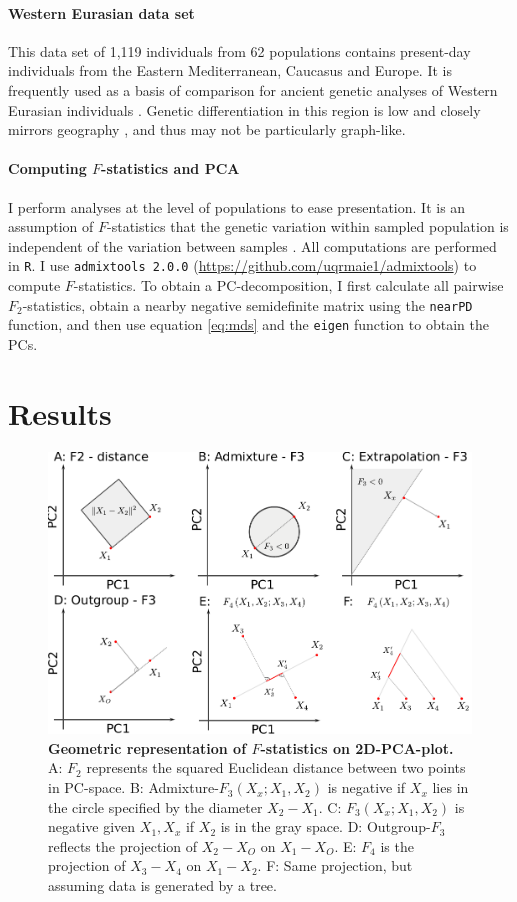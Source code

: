 \documentclass[12pt,fullpage, a4paper]{article}
\begin{document}
\paragraph{Western Eurasian data set}
This data set of 1,119 individuals from 62 populations contains  present-day individuals from the Eastern Mediterranean, Caucasus and Europe. It is frequently used as a basis of comparison for ancient genetic analyses of Western Eurasian individuals \citep{patterson2012, lazaridis2014}. Genetic differentiation in this region is low and closely mirrors geography \citep{novembre2008}, and thus may not be particularly graph-like.


\paragraph{Computing $F$-statistics and PCA}
I perform analyses at the level of populations to ease presentation.  It is an assumption of $F$-statistics that the genetic variation within sampled population is independent of the variation between samples \citep{patterson2012}. All computations are performed in \texttt{R}. I use \texttt{admixtools 2.0.0} (\url{https://github.com/uqrmaie1/admixtools}) to compute $F$-statistics. To obtain a PC-decomposition, I first calculate all pairwise $F_2$-statistics, obtain a nearby negative semidefinite matrix using the \texttt{nearPD} function, and then use equation \ref{eq:mds} and the \texttt{eigen} function to obtain the PCs. 

\section{Results}

\begin{figure}[!ht]
	\includegraphics[width=\textwidth]{figures/fstats_on_pca.pdf}
	\caption{\textbf{Geometric representation of $F$-statistics on 2D-PCA-plot.} A: $F_2$ represents the squared Euclidean distance between two points in PC-space. B: Admixture-$F_3(X_x; X_1, X_2)$ is negative if $X_x$ lies in the circle specified by the diameter $X_2-X_1$. C: $F_3(X_x; X_1, X_2)$ is negative given $X_1, X_x$ if $X_2$ is in the gray space.  D: Outgroup-$F_3$ reflects the projection of $X_2 - X_O$ on $X_1 - X_O$. E: $F_4$ is the projection of $X_3 - X_4$ on $X_1-X_2$. F: Same projection, but assuming data is generated by a tree.}
	\label{fig:geom}
\end{figure}
\end{document}
